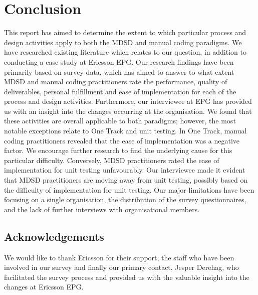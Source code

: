 \documentclass[fina_report_innit.tex]{subfiles}
\begin{document}
\section{Conclusion}
This report has aimed to determine the extent to which particular process and design activities apply to both the MDSD and manual coding paradigms. We have researched existing literature which relates to our question, in addition to conducting a case study at Ericsson EPG. Our research findings have been primarily based on survey data, which has aimed to answer to what extent MDSD and manual coding practitioners rate the performance, quality of deliverables, personal fulfillment and ease of implementation for each of the process and design activities. Furthermore, our interviewee at EPG has provided us with an insight into the changes occurring at the organisation. We found that these activities are overall applicable to both paradigms; however, the most notable exceptions relate to One Track and unit testing. In One Track, manual coding practitioners revealed that the ease of implementation was a negative factor. We encourage further research to find the underlying cause for this particular difficulty. Conversely, MDSD practitioners rated the ease of implementation for unit testing unfavourably. Our interviewee made it evident that MDSD practitioners are moving away from unit testing, possibly based on the difficulty of implementation for unit testing. Our major limitations have been focusing on a single organisation,  the distribution of the survey questionnaires, and the lack of further interviews with organisational members. 


\subsection*{Acknowledgements}
We would like to thank Ericsson for their support, the staff who have been involved in our survey and finally our primary contact, Jesper Derehag, who facilitated the survey process and provided us with the valuable insight into the changes at Ericsson EPG.
\end{document}
